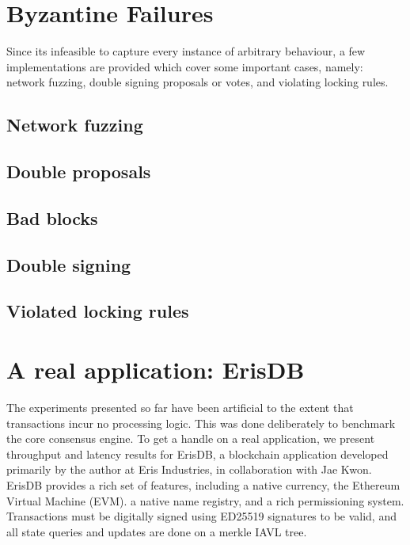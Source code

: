 \section{Byzantine Failures}

Since its infeasible to capture every instance of arbitrary behaviour,
a few implementations are provided which cover some important cases, namely:
network fuzzing, double signing proposals or votes, and violating locking rules.

\subsection{Network fuzzing}

\subsection{Double proposals}

\subsection{Bad blocks}

\subsection{Double signing}

\subsection{Violated locking rules}

\section{A real application: ErisDB}

The experiments presented so far have been artificial to the extent that transactions incur no processing logic.
This was done deliberately to benchmark the core consensus engine. 
To get a handle on a real application, we present throughput and latency results for ErisDB, 
a blockchain application developed primarily by the author at Eris Industries, in collaboration with Jae Kwon.
ErisDB provides a rich set of features, including a native currency, the Ethereum Virtual Machine (EVM).
a native name registry, and a rich permissioning system.
Transactions must be digitally signed using ED25519 signatures to be valid, and all state queries and updates are done on a merkle IAVL tree.

